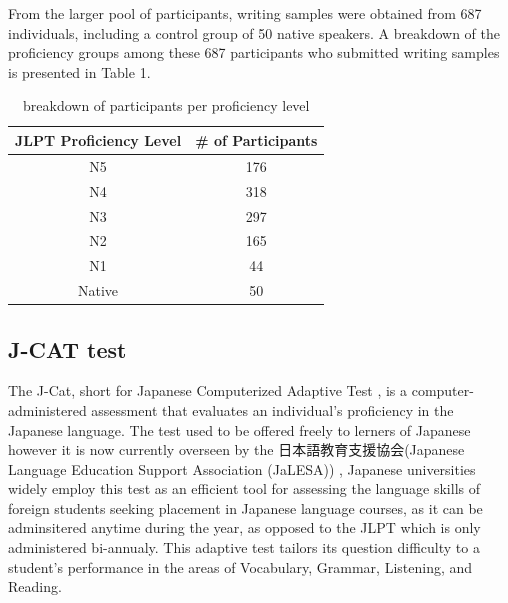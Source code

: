 From the larger pool of participants, writing samples were obtained from 687 individuals, including a control group
of 50 native speakers. A breakdown of the proficiency groups among these 687 participants who submitted writing
samples is presented in Table 1.



\begin{table}
\centering
\begin{tabular}{cc}
\hline \textbf{JLPT Proficiency Level} & \textbf{\# of Participants} \\ \hline
N5 & 176 \\
N4  & 318 \\
N3 & 297\\
N2 & 165 \\
N1 & 44 \\
Native & 50 \\
\hline
\end{tabular}
\caption{\label{participants-chart} breakdown of participants per proficiency level}
\end{table}


\subsection{J-CAT test}


The J-Cat, short for Japanese Computerized Adaptive Test \cite{Imai2009}, is a computer-administered assessment that
evaluates an
individual's proficiency in the Japanese language. The test used to be offered freely to lerners of Japanese however
it is now currently overseen by the 日本語教育支援協会(Japanese Language Education Support Association (JaLESA)) , Japanese
universities widely
employ this test as an efficient tool for assessing the language skills of foreign students seeking placement in
Japanese language courses, as it can be adminsitered anytime during the year, as opposed to the JLPT which is only
administered bi-annualy. This adaptive test tailors its
question difficulty to a
student's performance in
the areas of Vocabulary, Grammar, Listening, and Reading.

